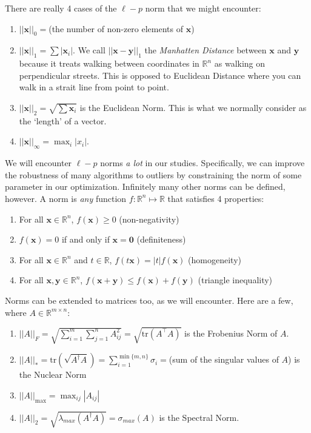 \documentclass{article}
\newcommand{\1}{\mathbf{1}}
\newcommand{\tr}{\mathrm{tr}}
\newcommand{\0}{\mathbf{0}}
\newcommand{\xx}{\mathbf{x}}
\newcommand{\yy}{\mathbf{y}}
\newcommand{\RR}{\mathbb{R}}
\newcommand{\T}{\top}
\begin{document}
There are really 4 cases of the $\ell-p$ norm that we might encounter:
\begin{enumerate}[-]
    \item $||\xx||_0 = $(the number of non-zero elements of $\xx$)
    \item $||\xx||_1 = \sum |\xx_i|$. We call $||\xx-\yy||_1$ the \textit{Manhatten Distance}
        between $\xx$ and $\yy$ because it treats walking between coordinates in
        $\RR^n$ as walking on perpendicular streets. This is opposed to Euclidean Distance
        where you can walk in a strait line from point to point.
    \item $||\xx||_2 = \sqrt{\sum\xx_i}$ is the Euclidean Norm. This is what we normally
        consider as the `length' of a vector.
    \item $||\xx||_\infty = \max_i |x_i|$.
\end{enumerate}
We will encounter $\ell-p$ norms \textit{a lot} in our studies. Specifically, we can
improve the robustness of many algorithms to outliers by constraining the norm
of some parameter in our optimization. Infinitely many other norms can be defined,
however. A norm is \textit{any} function $f : \RR^n \mapsto \RR$ that satisfies 4
properties:
\begin{enumerate}
\item For all $\xx\in\RR^n$, $f(\xx)\geq 0$ \hfill (non-negativity)
\item $f(\xx)=0$ if and only if $\xx=\0$ \hfill (definiteness)
\item For all $\xx\in\RR^n$ and $t\in\RR$, $f(t\xx) = |t|f(\xx)$ \hfill (homogeneity)
\item For all $\xx,\yy\in\RR^n$, $f(\xx+\yy) \leq f(\xx) + f(\yy)$ \hfill (triangle inequality)\\
\end{enumerate}

Norms can be extended to matrices too, as we will encounter. Here are
a few, where $A\in\RR^{m\times n}$:
\begin{enumerate}
    \item $||A||_F = \sqrt{\sum_{i=1}^m\sum_{j=1}^n A_{ij}^2} = \sqrt{\tr(A^\T A)}$ is the Frobenius Norm of $A$.
    \item $||A||_* = \tr(\sqrt{A^\dagger A}) = \sum_{i=1}^{\min\{m,n\}}\sigma_i = $(sum of the singular values of $A$) is the Nuclear Norm
    \item $||A||_{\mathrm{max}} = \max_{ij}|A_{ij}|$
    \item $||A||_2 = \sqrt{\lambda_{max}(A^\dagger A)} = \sigma_{max}(A)$ is the Spectral Norm.
\end{enumerate}
\end{document}
